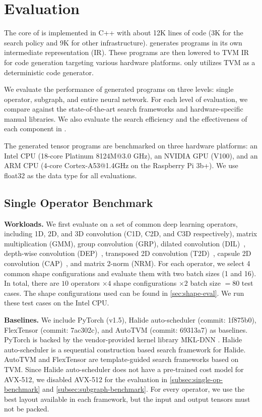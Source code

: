 \section{Evaluation}
\label{sec:evaluation}

The core of \Ansor is implemented in C++ with about 12K lines of code (3K for the search policy and 9K for other infrastructure).
\Ansor generates programs in its own intermediate representation (IR). 
These programs are then lowered to TVM IR for code generation targeting various hardware platforms. \Ansor only utilizes TVM as a deterministic code generator.

We evaluate the performance of generated programs on three levels: single operator, subgraph, and entire neural network.
For each level of evaluation, we compare \Ansor against the state-of-the-art search frameworks and hardware-specific manual libraries.
We also evaluate the search efficiency and the effectiveness of each component in \Ansor.


The generated tensor programs are benchmarked on three hardware platforms: an Intel CPU (18-core Platinum 8124M@3.0 GHz), an NVIDIA GPU (V100), and an ARM CPU (4-core Cortex-A53@1.4GHz on the Raspberry Pi 3b+). We use float32 as the data type for all evaluations.

\subsection{Single Operator Benchmark}
\label{subsec:single-op-benchmark}


\textbf{Workloads.}
We first evaluate \Ansor on a set of common deep learning operators, including 1D, 2D, and 3D convolution (C1D, C2D, and C3D respectively), matrix multiplication (GMM), group convolution (GRP), dilated convolution (DIL)~\cite{yu2015multi}, depth-wise convolution (DEP)~\cite{howard2017mobilenets}, transposed 2D convolution (T2D)~\cite{radford2015unsupervised}, capsule 2D convolution (CAP)~\cite{hinton2018matrix}, and matrix 2-norm (NRM). For each operator, we select 4 common shape configurations and evaluate them with two batch sizes (1 and 16).
In total, there are $10$ operators $\times 4$ shape configurations  $\times 2$  batch size $=80$ test cases.
The shape configurations used can be found in \autoref{sec:shape-eval}.
We run these test cases on the Intel CPU.

\textbf{Baselines.}
We include PyTorch (v1.5)\cite{paszke2019pytorch}, Halide auto-scheduler (commit: 1f875b0)\cite{adams2019learning}, FlexTensor (commit: 7ac302c)\cite{zheng2020flextensor}, and AutoTVM (commit: 69313a7)\cite{chen2018learning} as baselines.
PyTorch is backed by the vendor-provided kernel library MKL-DNN \cite{intel2017mkldnn}.
Halide auto-scheduler is a sequential construction based search framework for Halide. 
AutoTVM and FlexTensor are template-guided search frameworks based on TVM. 
Since Halide auto-scheduler does not have a pre-trained cost model for AVX-512, we disabled AVX-512 for the evaluation in \autoref{subsec:single-op-benchmark} and \autoref{subsec:subgraph-benchmark}.
For every operator, we use the best layout available in each framework, but the input and output tensors must not be packed.

